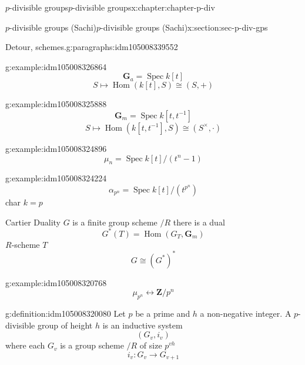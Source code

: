 \documentclass[oneside,10pt,]{book}
\numberwithin{equation}{section}
\newcommand{\inv}{^{-1}}
\newcommand{\ZZ}{\mathbf{Z}}
\DeclareMathOperator{\Hom}{Hom}
\DeclareMathOperator{\Spec}{Spec}
\begin{document}
\begin{chapterptx}{\(p\)-divisible groups}{}{\(p\)-divisible groups}{}{}{x:chapter:chapter-p-div}
\begin{sectionptx}{\(p\)-divisible groups (Sachi)}{}{\(p\)-divisible groups (Sachi)}{}{}{x:section:sec-p-div-gps}
\begin{paragraphs}{Detour, schemes.}{g:paragraphs:idm105008339552}
\begin{example}{}{g:example:idm105008326864}
%
\begin{equation*}
\mathbf G_a = \Spec k[t]
\end{equation*}
%
\begin{equation*}
S\mapsto \Hom(k[t], S) \cong (S,+)
\end{equation*}
%
\end{example}
\begin{example}{}{g:example:idm105008325888}%
%
\begin{equation*}
\mathbf G_m = \Spec k[t,t\inv]
\end{equation*}
%
\begin{equation*}
S\mapsto \Hom(k[t,t\inv], S) \cong (S^\times,\cdot)
\end{equation*}
%
\end{example}
\begin{example}{}{g:example:idm105008324896}%
%
\begin{equation*}
\mu_n = \Spec k[t]/(t^n -1)
\end{equation*}
%
\end{example}
\begin{example}{}{g:example:idm105008324224}%
%
\begin{equation*}
\alpha_{p^n} = \Spec k[t]/(t^{p^n})
\end{equation*}
char \(k = p\)%
\end{example}
Cartier Duality \(G\) is a finite group scheme \(/R\) there is a dual%
\begin{equation*}
G^* (T) = \Hom (G_T, \mathbf G_m)
\end{equation*}
\(R\)-scheme \(T\)%
\begin{equation*}
G \cong (G^*)^*
\end{equation*}
%
\begin{example}{}{g:example:idm105008320768}%
%
\begin{equation*}
\mu_{p^n} \leftrightarrow \ZZ/p^n
\end{equation*}
%
\end{example}
\begin{definition}{}{g:definition:idm105008320080}%
Let \(p\) be a prime and \(h\) a non-negative integer. A \(p\)-divisible group of height \(h\) is an inductive system%
\begin{equation*}
(G_v, i_v)
\end{equation*}
where each \(G_v\) is a group scheme \(/R\) of size \(p^{vh}\)%
\begin{equation*}
i_v \colon G_v \to G_{v+1}
\end{equation*}

\end{definition}
\end{paragraphs}
\end{sectionptx}
\end{chapterptx}
\end{document}
